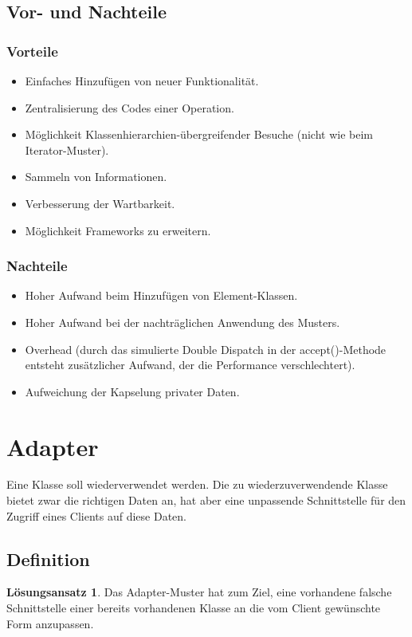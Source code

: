 \documentclass[12pt,a4paper,titlepage]{article}
\theoremstyle{definition}
\newtheorem*{definition*}{Lösungsansatz}
\begin{document}
\newpage

\subsection{Vor- und Nachteile}
\subsubsection{Vorteile}
\begin{itemize}
	\item Einfaches Hinzufügen von neuer Funktionalität.
	\item Zentralisierung des Codes einer Operation.
	\item Möglichkeit Klassenhierarchien-übergreifender Besuche (nicht wie beim Iterator-Muster).
	\item Sammeln von Informationen.
	\item Verbesserung der Wartbarkeit.
	\item Möglichkeit Frameworks zu erweitern.
\end{itemize}

\subsubsection{Nachteile}
\begin{itemize}
	\item Hoher Aufwand beim Hinzufügen von Element-Klassen.
	\item Hoher Aufwand bei der nachträglichen Anwendung des Musters.
	\item Overhead (durch das simulierte Double Dispatch in der accept()-Methode entsteht zusätzlicher Aufwand, der die Performance verschlechtert).
	\item Aufweichung der Kapselung privater Daten.
\end{itemize}

\newpage

\section{Adapter}
Eine Klasse soll wiederverwendet werden. Die zu wiederzuverwendende Klasse bietet zwar die richtigen Daten an, hat aber eine unpassende Schnittstelle für den Zugriff eines Clients auf diese Daten.

\subsection{Definition}
\begin{definition*}
	Das Adapter-Muster hat zum Ziel, eine vorhandene \glqq falsche\grqq ~ Schnittstelle einer bereits vorhandenen Klasse an die vom Client gewünschte Form anzupassen.
\end{definition*}
\end{document}
